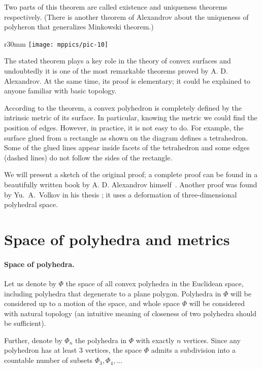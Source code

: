 \documentclass[oneside,a4paper]{article}
\begin{document}
Two parts of this theorem are called existence and uniqueness theorems respectively.
(There is another theorem of Alexandrov about the uniqueness of polyheron that generalizes Minkowski theorem.)

\begin{wrapfigure}{r}{30mm}
\vskip-0mm
\centering
\texttt{[image: mppics/pic-10]}
\vskip-0mm
\end{wrapfigure}

The stated theorem plays a key role in the theory of convex surfaces and undoubtedly it is one of the most remarkable theorems proved by A. D. Alexandrov.
At the same time, its proof is elementary;
it could be explained to anyone familiar with basic topology.


According to the theorem, a convex polyhedron is completely defined by the intrinsic metric of its surface.
In particular, knowing the metric we could find the position of edges.
However, in practice, it is not easy to do.
For example, the surface glued from a rectangle as shown on the diagram defines a tetrahedron.
Some of the glued lines appear inside facets of the tetrahedron and some edges (dashed lines) do not follow the sides of the rectangle.

We will present a sketch of the original proof;
a complete proof can be found in a beautifully written book by A. D. Alexandrov himself~\cite{alexandrov}.
Another proof was found by Yu.~A.~Volkov in his thesis \cite{volkov};
it uses a deformation of three-dimensional polyhedral space.


\section{Space of polyhedra and metrics}

\paragraph{Space of polyhedra.}
Let us denote by $\Phi$ the space of all convex polyhedra in the Euclidean space,
including polyhedra that degenerate to a plane polygon.
Polyhedra in $\Phi$ will be considered up to a motion of the space, 
and whole space $\Phi$ will be considered with natural topology (an intuitive meaning of closeness of two polyhedra should be sufficient).  

Further, denote by $\Phi_n$ the polyhedra in $\Phi$ with exactly $n$ vertices.
Since any polyhedron has at least 3 vertices, the space $\Phi$ admits a subdivision into a countable number of subsets $\Phi_3,\Phi_4,\dots$
\end{document}
